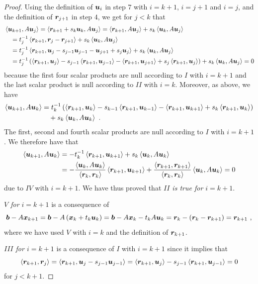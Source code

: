 \begin{proof}
Using the definition of $\bm{u}_i$ in step $7$ with $i=k+1$, $i=j+1$
and $i=j$, and the definition of $\bm{r}_{j+1}$ in step $4$, we get
for $j<k$ that
\begin{align*}
&\left\langle{\bm{u}_{k+1}} , {A\bm{u}_j}\right\rangle
= \left\langle{\bm{r}_{k+1} + s_k\bm{u}_k} , {A\bm{u}_j}\right\rangle
= \left\langle{\bm{r}_{k+1}} , {A\bm{u}_j}\right\rangle + s_k \left\langle{\bm{u}_k} , {A\bm{u}_j}\right\rangle \\
&\quad = t_j^{-1}\left\langle{\bm{r}_{k+1}} , {\bm{r}_j - \bm{r}_{j+1}}\right\rangle +
s_k \left\langle{\bm{u}_k} , {A\bm{u}_j}\right\rangle \\
&\quad = t_j^{-1} \left\langle{\bm{r}_{k+1}} , {\bm{u}_j - s_{j-1}\bm{u}_{j-1}
- \bm{u}_{j+1} + s_j \bm{u}_j}\right\rangle + s_k \left\langle{\bm{u}_k} , {A\bm{u}_j}\right\rangle \\
&\quad = t_j^{-1} \left( \left\langle{\bm{r}_{k+1}} , {\bm{u}_j}\right\rangle
- s_{j-1}\left\langle{\bm{r}_{k+1}} , {\bm{u}_{j-1}}\right\rangle
- \left\langle{\bm{r}_{k+1}} , {\bm{u}_{j+1}}\right\rangle
+ s_j \left\langle{\bm{r}_{k+1}} , {\bm{u}_j}\right\rangle\right)
+ s_k \left\langle{\bm{u}_k} , {A\bm{u}_j}\right\rangle
= 0
\end{align*}
because the first four scalar products are null according to $I$ with
$i=k+1$ and the last scalar product is null according to $II$ with
$i=k$.  Moreover, as above, we have
\begin{align*}
\left\langle{\bm{u}_{k+1}} , {A\bm{u}_k}\right\rangle
&= t_k^{-1} \left( \left\langle{\bm{r}_{k+1}} , {\bm{u}_k}\right\rangle
- s_{k-1}\left\langle{\bm{r}_{k+1}} , {\bm{u}_{k-1}}\right\rangle
- \left\langle{\bm{r}_{k+1}} , {\bm{u}_{k+1}}\right\rangle + s_k \left\langle{\bm{r}_{k+1}} , {\bm{u}_k}\right\rangle\right)\\
&\quad + s_k \left\langle{\bm{u}_k} , {A\bm{u}_k}\right\rangle \ .
\end{align*}
The first, second and fourth scalar products are null according to $I$
with $i=k+1$.  We therefore have that
\begin{align*}
\left\langle{\bm{u}_{k+1}} , {A\bm{u}_k}\right\rangle
&= - t_k^{-1} \left\langle{\bm{r}_{k+1}} , {\bm{u}_{k+1}}\right\rangle
+ s_k \left\langle{\bm{u}_k} , {A\bm{u}_k}\right\rangle \\
&= -\frac{\left\langle{\bm{u}_k} , {A\bm{u}_k}\right\rangle}{\left\langle{\bm{r}_k} , {\bm{r}_k}\right\rangle}
\left\langle{\bm{r}_{k+1}} , {\bm{u}_{k+1}}\right\rangle
+\frac{\left\langle{\bm{r}_{k+1}} , {\bm{r}_{k+1}}\right\rangle}{\left\langle{\bm{r}_k} , {\bm{r}_k}\right\rangle}
\left\langle{\bm{u}_k} , {A\bm{u}_k}\right\rangle
=0
\end{align*}
due to $IV$ with $i=k+1$.  We have thus proved that
{\em $II$ is true for $i=k+1$}.

{\em $V$ for $i=k+1$} is a consequence of
\[
\bm{b}-A\bm{x}_{k+1} = \bm{b}-A\left(\bm{x}_k+t_k\bm{u}_k\right)
= \bm{b}- A\bm{x}_k - t_k A\bm{u}_k
= \bm{r}_k - \left(\bm{r}_k - \bm{r}_{k+1}\right)
= \bm{r}_{k+1} \ ,
\]
where we have used $V$ with $i=k$ and the definition of $\bm{r}_{k+1}$.

{\em $III$ for $i=k+1$} is a consequence of $I$ with $i=k+1$ since
it implies that
\[
\left\langle{\bm{r}_{k+1}} , {\bm{r}_j}\right\rangle 
= \left\langle{\bm{r}_{k+1}} , {\bm{u}_j - s_{j-1}\bm{u}_{j-1}}\right\rangle 
= \left\langle{\bm{r}_{k+1}} , {\bm{u}_j}\right\rangle - s_{j-1}\left\langle{\bm{r}_{k+1}} , {\bm{u}_{j-1}}\right\rangle 
= 0
\]
for $j<k+1$.


\end{proof}
